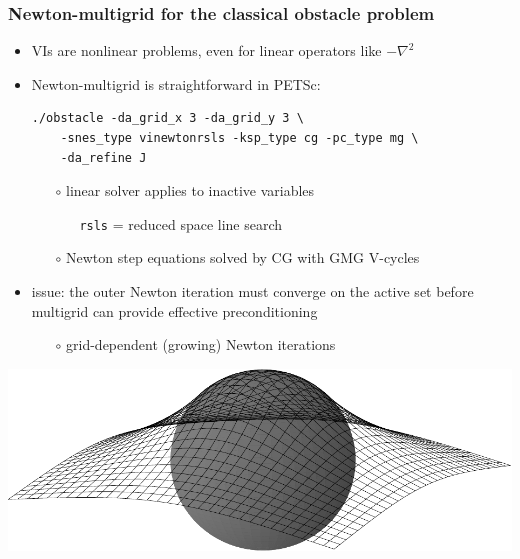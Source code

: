 \documentclass[svgnames,
               hyperref={colorlinks,citecolor=DeepPink4,linkcolor=FireBrick,urlcolor=Maroon},
               usepdftitle=false]  %
               {beamer}
\begin{document}
\begin{frame}[fragile]
\frametitle{Newton-multigrid for the classical obstacle problem}

\begin{itemize}
\item VIs are nonlinear problems, even for linear operators like $-\nabla^2$
\item Newton-multigrid is straightforward in PETSc:
\begin{Verbatim}[xleftmargin=13mm,fontsize=\scriptsize]
./obstacle -da_grid_x 3 -da_grid_y 3 \
    -snes_type vinewtonrsls -ksp_type cg -pc_type mg \
    -da_refine J
\end{Verbatim}
    \begin{itemize}
    \item[$\circ$] linear solver applies to inactive variables
        \begin{itemize}
        \item[] \texttt{rsls} = reduced space line search
        \end{itemize}
    \item[$\circ$] Newton step equations solved by CG with GMG V-cycles
    \end{itemize}
\item issue: the outer Newton iteration must converge on the active set \alert{before} multigrid can provide effective preconditioning
    \begin{itemize}
    \item[$\circ$] grid-dependent (growing) Newton iterations
    \end{itemize}
\end{itemize}

\medskip
\hspace{10mm} \includegraphics[height=0.2\textheight]{../talk-oxford/images/obstacle65.pdf}


\end{frame}
\end{document}
